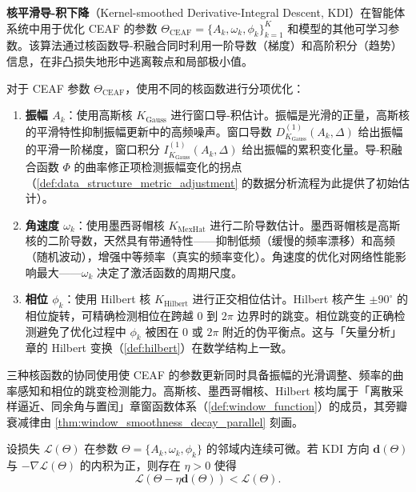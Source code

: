 \begin{definition}\label{def:kdi_agent}
\textbf{核平滑导-积下降}（Kernel-smoothed Derivative-Integral Descent, KDI）在智能体系统中用于优化 CEAF 的参数 $\Theta_{\text{CEAF}} = \{A_k, \omega_k, \phi_k\}_{k=1}^{K}$ 和模型的其他可学习参数。该算法通过核函数导-积融合同时利用一阶导数（梯度）和高阶积分（趋势）信息，在非凸损失地形中逃离鞍点和局部极小值。

对于 CEAF 参数 $\Theta_{\text{CEAF}}$，使用不同的核函数进行分项优化：
\begin{enumerate}[label=(\roman*)]
    \item \textbf{振幅 $A_k$}：使用高斯核 $K_{\text{Gauss}}$ 进行窗口导-积估计。振幅是光滑的正量，高斯核的平滑特性抑制振幅更新中的高频噪声。窗口导数 $D_{K_{\text{Gauss}}}^{(1)}(A_k, \Delta)$ 给出振幅的平滑一阶梯度，窗口积分 $I_{K_{\text{Gauss}}}^{(1)}(A_k, \Delta)$ 给出振幅的累积变化量。导-积融合函数 $\Phi$ 的曲率修正项检测振幅变化的拐点（\cref{def:data_structure_metric_adjustment} 的数据分析流程为此提供了初始估计）。
    \item \textbf{角速度 $\omega_k$}：使用墨西哥帽核 $K_{\text{MexHat}}$ 进行二阶导数估计。墨西哥帽核是高斯核的二阶导数，天然具有带通特性——抑制低频（缓慢的频率漂移）和高频（随机波动），增强中等频率（真实的频率变化）。角速度的优化对网络性能影响最大——$\omega_k$ 决定了激活函数的周期尺度。
    \item \textbf{相位 $\phi_k$}：使用 Hilbert 核 $K_{\text{Hilbert}}$ 进行正交相位估计。Hilbert 核产生 $\pm 90^\circ$ 的相位旋转，可精确检测相位在跨越 $0$ 到 $2\pi$ 边界时的跳变。相位跳变的正确检测避免了优化过程中 $\phi_k$ 被困在 $0$ 或 $2\pi$ 附近的伪平衡点。这与「矢量分析」章的 Hilbert 变换（\cref{def:hilbert}）在数学结构上一致。
\end{enumerate}
三种核函数的协同使用使 CEAF 的参数更新同时具备振幅的光滑调整、频率的曲率感知和相位的跳变检测能力。高斯核、墨西哥帽核、Hilbert 核均属于「离散采样逼近、同余角与置闰」章窗函数体系（\cref{def:window_function}）的成员，其旁瓣衰减律由 \cref{thm:window_smoothness_decay_parallel} 刻画。
\end{definition}

\begin{proposition}\label{prop:kdi_epicycle_descent_agent}
设损失 $\mathcal{L}(\Theta)$ 在参数 $\Theta = \{A_k, \omega_k, \phi_k\}$ 的邻域内连续可微。若 KDI 方向 $\mathbf{d}(\Theta)$ 与 $-\nabla\mathcal{L}(\Theta)$ 的内积为正，则存在 $\eta > 0$ 使得
\[
\mathcal{L}(\Theta - \eta\mathbf{d}(\Theta)) < \mathcal{L}(\Theta).
\]
\end{proposition}

